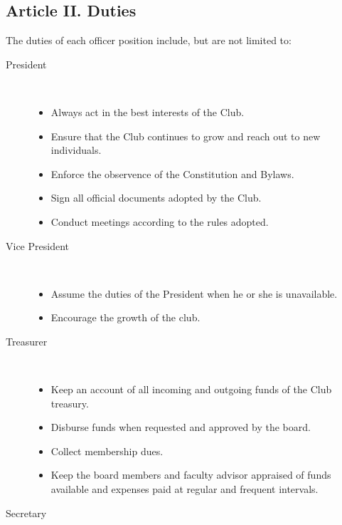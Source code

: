 \documentclass{article}
\begin{document}
  \subsection{Article II. Duties}
    The duties of each officer position include, but are not limited to:

    \begin{description}
        \item[President] ~\\
          \vspace{-12pt}
          \begin{itemize}
            \item Always act in the best interests of the Club.
            \item Ensure that the Club continues to grow and reach out to new individuals.
            \item Enforce the observence of the Constitution and Bylaws.
            \item Sign all official documents adopted by the Club.
            \item Conduct meetings according to the rules adopted.
          \end{itemize}
        \item[Vice President] ~\\
          \vspace{-12pt}
          \begin{itemize}
            \item Assume the duties of the President when he or she is unavailable.
            \item Encourage the growth of the club.
          \end{itemize}
        \item[Treasurer] ~\\
          \vspace{-12pt}
          \begin{itemize}
            \item Keep an account of all incoming and outgoing funds of the Club treasury.
            \item Disburse funds when requested and approved by the board.
            \item Collect membership dues.
            \item Keep the board members and faculty advisor appraised of funds available and expenses paid at regular and frequent intervals.
          \end{itemize}
        \item[Secretary] ~\\

\end{description}
\end{document}
